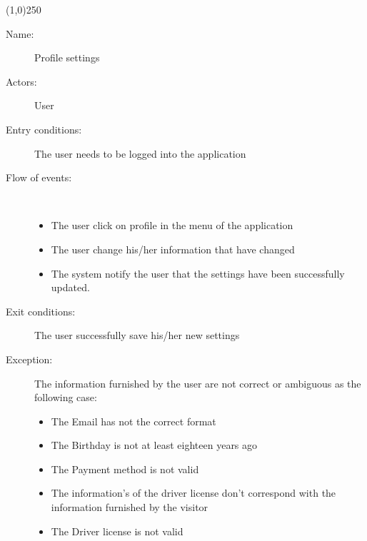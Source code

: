 \begin{center}
\line(1,0){250}
\end{center}

\begin{description}
	\item[Name:] Profile settings
	\item[Actors:] User 
	\item[Entry conditions:] The user needs to be logged into the application
	\item[Flow of events:]  \ \\
		\begin{itemize}
			\item The user click on profile in the menu of the application
			\item The user change his/her information that have changed
			\item The system notify the user that the settings have been successfully updated.
		\end{itemize}
	\item[Exit conditions:] The user successfully save his/her new settings
	\item [Exception:] The information furnished by the user are not correct or ambiguous as the following case:
		\begin{itemize}
			\item The Email has not the correct format
			\item The Birthday is not at least eighteen years ago
			\item The Payment method is not valid
			\item The information's of the driver license don't correspond with the information furnished by the visitor
			\item The Driver license is not valid
		\end {itemize}
\end{description}
